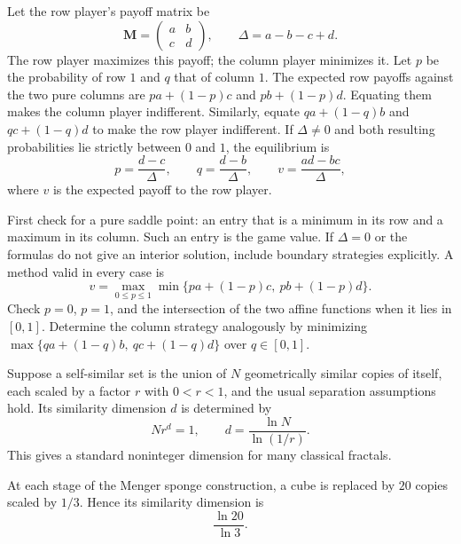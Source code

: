     \begin{algorithm}\label{r4:zero-sum}
        Let the row player's payoff matrix be
        \[
            \mathbf{M}=\begin{pmatrix}a&b\\c&d\end{pmatrix},
            \qquad \Delta=a-b-c+d.
        \]
        The row player maximizes this payoff; the column player minimizes it.
        Let $p$ be the probability of row $1$ and $q$ that of column $1$.
        The expected row payoffs against the two pure columns are
        $pa+(1-p)c$ and $pb+(1-p)d$. Equating them makes the column player
        indifferent. Similarly, equate $qa+(1-q)b$ and $qc+(1-q)d$ to make
        the row player indifferent. If $\Delta\neq0$ and both resulting
        probabilities lie strictly between $0$ and $1$, the equilibrium is
        \[
            p=\frac{d-c}{\Delta},\qquad
            q=\frac{d-b}{\Delta},\qquad
            v=\frac{ad-bc}{\Delta},
        \]
        where $v$ is the expected payoff to the row player.

        First check for a pure saddle point: an entry that is a minimum in
        its row and a maximum in its column. Such an entry is the game value.
        If $\Delta=0$ or the formulas do not give an interior solution,
        include boundary strategies explicitly. A method valid in every case is
        \[
            v=\max_{0\leq p\leq1}\min\{pa+(1-p)c,\ pb+(1-p)d\}.
        \]
        Check $p=0$, $p=1$, and the intersection of the two affine functions
        when it lies in $[0,1]$. Determine the column strategy analogously by
        minimizing $\max\{qa+(1-q)b,\ qc+(1-q)d\}$ over $q\in[0,1]$.
    \end{algorithm}

    \begin{definition}
        Suppose a self-similar set is the union of $N$ geometrically similar
        copies of itself, each scaled by a factor $r$ with $0<r<1$, and the
        usual separation assumptions hold. Its similarity dimension $d$ is
        determined by
        \[
            Nr^d=1,
            \qquad
            d=\frac{\ln N}{\ln(1/r)}.
        \]
        This gives a standard noninteger dimension for many classical fractals.
    \end{definition}

    \begin{fact}
        At each stage of the Menger sponge construction, a cube is replaced by
        $20$ copies scaled by $1/3$. Hence its similarity dimension is
        \[
            \boxed{\frac{\ln20}{\ln3}}.
        \]
    \end{fact}


